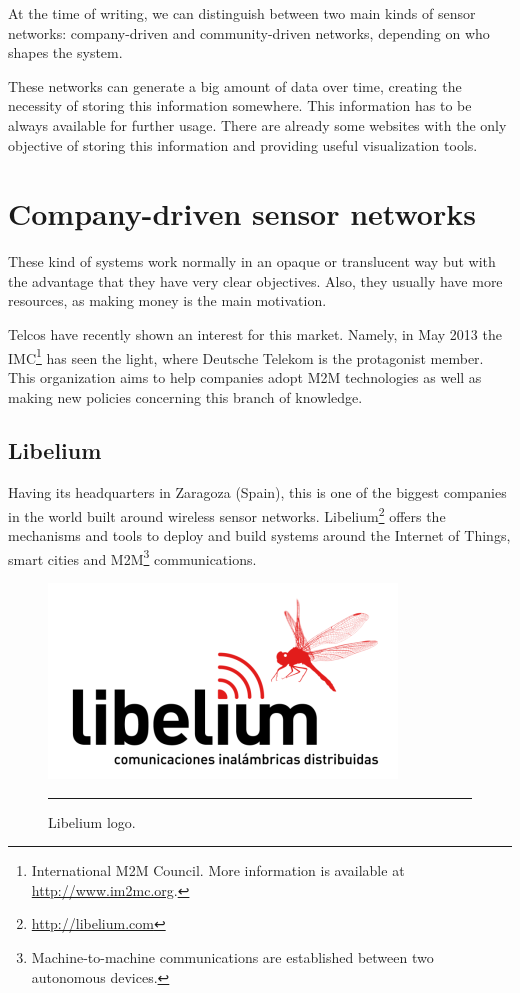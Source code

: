 At the time of writing, we can distinguish between two main kinds of sensor networks: company-driven and community-driven networks, depending on who shapes the system.

These networks can generate a big amount of data over time, creating the necessity of storing this information somewhere. This information has to be always available for further usage. There are already some websites with the only objective of storing this information and providing useful visualization tools.


\section{Company-driven sensor networks}

These kind of systems work normally in an opaque or translucent way but with the advantage that they have very clear objectives. Also, they usually have more resources, as making money is the main motivation.

Telcos have recently shown an interest for this market. Namely, in May 2013 the IMC\footnote{International M2M Council. More information is available at \url{http://www.im2mc.org}.} has seen the light, where Deutsche Telekom is the protagonist member. This organization aims to help companies adopt M2M technologies as well as making new policies concerning this branch of knowledge.

\subsection{Libelium}

Having its headquarters in Zaragoza (Spain), this is one of the biggest companies in the world built around wireless sensor networks. Libelium\footnote{\url{http://libelium.com}} offers the mechanisms and tools to deploy and build systems around the Internet of Things, smart cities and M2M\footnote{Machine-to-machine communications are established between two autonomous devices.} communications.

\begin{figure}[htbp]
    \centering
    \includegraphics[scale=2]{./Figures/libelium_logo.png}
        \rule{35em}{0.5pt}
        \caption[Libelium logo]{Libelium logo.}
    \label{fig:ArduinoUNO}
\end{figure}

